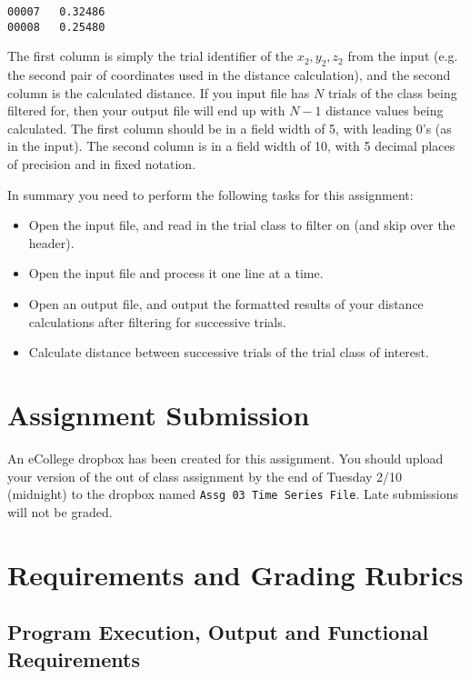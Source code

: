 \documentclass[11pt]{article}
\begin{document}
\begin{verbatim}
00007   0.32486
00008   0.25480
\end{verbatim}

The first column is simply the trial identifier of the $x_2, y_2, z_2$
from the input (e.g.  the second pair of coordinates used in the
distance calculation), and the second column is the calculated
distance.  If you input file has $N$ trials of the class being
filtered for, then your output file will end up with $N-1$ distance
values being calculated.  The first column should be in a field width
of 5, with leading 0's (as in the input).  The second column is in a
field width of 10, with 5 decimal places of precision and in fixed
notation.

In summary you need to perform the following tasks for this assignment:

\begin{itemize}
\item Open the input file, and read in the trial class to filter on (and
  skip over the header).
\item Open the input file and process it one line at a time.
\item Open an output file, and output the formatted results of your
  distance calculations after filtering for successive trials.
\item Calculate distance between successive trials of the trial class
  of interest.
\end{itemize}
\section*{Assignment Submission}
\label{sec-4}


An eCollege dropbox has been created for this assignment.  You should
upload your version of the out of class assignment by the end of
Tuesday 2/10 (midnight) to the dropbox named \verb~Assg 03 Time Series File~.
Late submissions will not be graded.
\section*{Requirements and Grading Rubrics}
\label{sec-5}
\subsection*{Program Execution, Output and Functional Requirements}
\label{sec-5-1}
\end{document}
